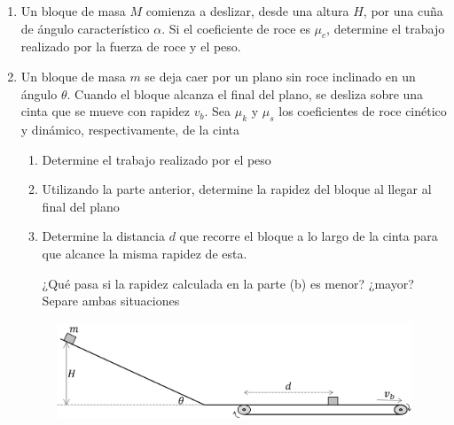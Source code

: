 \documentclass[letterpaper,11pt]{article}
\begin{document}
\begin{enumerate}
\begin{multicols}{2}
\columnbreak

\begin{figure}[H]
    \centering
         
\end{figure}

\end{multicols}

\item Un bloque de masa $M$ comienza a deslizar, desde una altura $H$, por una cuña de ángulo característico $\alpha$. Si el coeficiente de roce es $\mu_c$, determine el trabajo realizado por la fuerza de roce y el peso.

\begin{figure}[H]
    \centering
    
\end{figure}

\item Un bloque de masa $m$ se deja caer por un plano sin roce inclinado en un ángulo $\theta$. Cuando el bloque alcanza el final del plano, se desliza sobre una cinta que se mueve con rapidez $v_b$. Sea $\mu_k$ y $\mu_s$ los coeficientes de roce cinético y dinámico, respectivamente, de la cinta

\begin{enumerate}
    \item Determine el trabajo realizado por el peso
    
    \item Utilizando la parte anterior, determine la rapidez del bloque al llegar al final del plano
    
    \item Determine la distancia $d$ que recorre el bloque a lo largo de la cinta para que alcance la misma rapidez de esta.
    
    ¿Qué pasa si la rapidez calculada en la parte (b) es menor? ¿mayor? Separe ambas situaciones
\end{enumerate}

\begin{figure}[H]
    \centering
    \includegraphics[width=0.8\linewidth]{2023-1/img/TD 3/cinta.png}
\end{figure}



%   

\end{enumerate}
\end{document}
